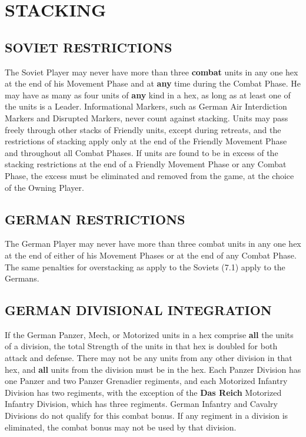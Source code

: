 \section{STACKING}

\subsection{SOVIET RESTRICTIONS}

The Soviet Player may never have more than three \textbf{combat} units in any one hex at the end of his Movement Phase and at \textbf{any} time during the Combat Phase. He may have as many as four units of \textbf{any} kind in a hex, as long as at least one of the units is a Leader. Informational Markers, such as German Air Interdiction Markers and Disrupted Markers, never count against stacking. Units may pass freely through other stacks of Friendly units, except during retreats, and the restrictions of stacking apply only at the end of the Friendly Movement Phase and throughout all Combat Phases. If units are found to be in excess of the stacking restrictions at the end of a Friendly Movement Phase or any Combat Phase, the excess must be eliminated and removed from the game, at the choice of the Owning Player.

\subsection{GERMAN RESTRICTIONS}

The German Player may never have more than three combat units in any one hex at the end of either of his Movement Phases or at the end of any Combat Phase. The same penalties for overstacking as apply to the Soviets (7.1) apply to the Germans.

\subsection{GERMAN DIVISIONAL INTEGRATION}

If the German Panzer, Mech, or Motorized units in a hex comprise \textbf{all} the units of a division, the total Strength of the units in that hex is doubled for both attack and defense. There may not be any units from any other division in that hex, and \textbf{all} units from the division must be in the hex. Each Panzer Division has one Panzer and two Panzer Grenadier regiments, and each Motorized Infantry Division has two regiments, with the exception of the \textbf{Das Reich} Motorized Infantry Division, which has three regiments. German Infantry and Cavalry Divisions do not qualify for this combat bonus. If any regiment in a division is eliminated, the combat bonus may not be used by that division.